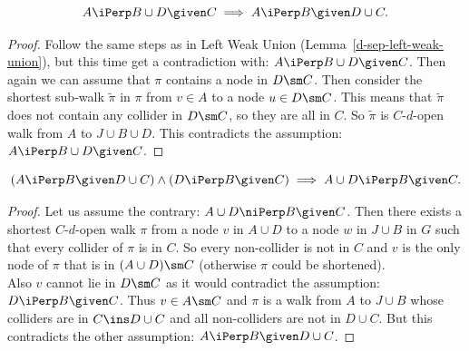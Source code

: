 \begin{Lem} 
    \[A \iPerp  B \cup  D \given C \implies A \iPerp  B \given D \cup  C.\]
\begin{proof}
    Follow the same steps as in Left Weak Union (Lemma~\ref{d-sep-left-weak-union}), 
    but this time get a contradiction with:
    $A \iPerp  B \cup  D \given C$.
    Then again we can assume that $\pi$ contains a node in $D \sm C$. 
    Then consider the shortest sub-walk $\tilde \pi$ in $\pi$ from $v \in A$ to a node $u \in D \sm C$.
    This means that $\tilde \pi$ does not contain any collider in $D\sm C$, 
    so they are all in $C$. So $\tilde \pi$ is $C$-$d$-open walk from $A$ to $J \cup B \cup D$. 
    This contradicts the assumption: $A \iPerp  B \cup D  \given C$.
\end{proof}
\end{Lem}

\begin{Lem} 
        \label{d-sep-left-contraction}
    \[ (A \iPerp  B \given D \cup  C) \land (D \iPerp  B \given C) \implies A \cup  D \iPerp  B \given C.\]
\begin{proof}
    Let us assume the contrary:  $A \cup D \niPerp  B \given C$.
    Then there exists a shortest $C$-$d$-open walk $\pi$ 
    from a node $v$ in $A \cup D$ to a node $w$ in $J \cup B$ in $G$ such that every collider of $\pi$ is in $C$. 
    So every non-collider is not in $C$ and $v$ is 
    the only node of $\pi$ that is in $(A \cup D) \sm C$ (otherwise $\pi$ could be shortened). \\
    Also $v$ cannot lie in $D\sm C$ as it would contradict the assumption: $D \iPerp  B \given C$.
    Thus $v \in A \sm C$ and $\pi$ is a walk from $A$ to $J \cup B$ whose colliders are in $C \ins D \cup C$ 
    and all non-colliders are not in $D \cup C$.
    But this contradicts the other assumption: $A \iPerp  B \given D \cup  C$.
\end{proof}
\end{Lem}

